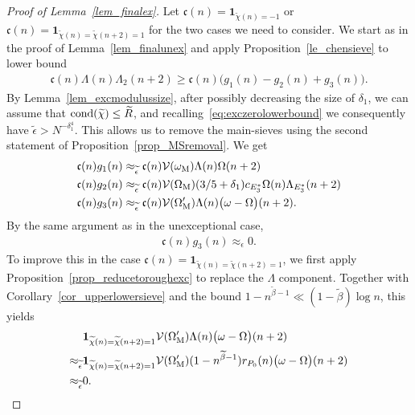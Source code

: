 \documentclass[12pt]{amsart}
\theoremstyle{definition}
\theoremstyle{remark}
\numberwithin{equation}{section}
\newcommand{\1}{\mathbf{1}}
\newcommand{\cond}[1]{\textnormal{cond}{#1}}
\begin{document}
			
			\begin{proof}[Proof of Lemma~\ref{lem_finalex}]
                Let $\mathfrak{c}(n)=  \1_{\widetilde{\chi}(n)=-1} $ or $\mathfrak{c}(n)=\1_{\widetilde{\chi}(n)=\widetilde{\chi}(n+2)=1}$ for the two cases we need to consider. We start as in the proof of Lemma~\ref{lem_finalunex} and apply Proposition~\ref{le_chensieve} to lower bound
                \begin{align*}
                    \mathfrak{c}(n)\Lambda(n)\Lambda_2(n+2)\geq  \mathfrak{c}(n)\bigl(g_1(n)-g_2(n)+g_3(n)\bigr).
                \end{align*}
                By Lemma~\ref{lem_excmodulussize}, after possibly decreasing the size of $\delta_1$, we can assume that $\cond(\widetilde{\chi})\leq \widetilde{R}$, and recalling~\eqref{eq:exczerolowerbound} we consequently have $\widetilde{\epsilon}>N^{-\delta_1^{4}}$. This allows us to remove the main-sieves using the second statement of Proposition~\ref{prop_MSremoval}. We get
                \begin{align*}
                \mathfrak{c}(n)g_1(n)&\approx_{\widetilde{\epsilon}} \mathfrak{c}(n) \mathcal{V}(\omega_{\textup{M}}) \Lambda(n)\Omega(n+2) \\
                \mathfrak{c}(n)g_2(n)&\approx_{\widetilde{\epsilon}} \mathfrak{c}(n)\mathcal{V}(\Omega_{\textup{M}})(3/5+\delta_1)c_{E_3^*}\Omega(n)\Lambda_{E_3^*}(n+2)\\
               \mathfrak{c}(n) g_3(n)&\approx_{\widetilde{\epsilon}} \mathfrak{c}(n) \mathcal{V}(\Omega'_{\textup{M}}) \Lambda(n)\bigl(\omega -\Omega\bigr)(n+2).
              \end{align*}
              By the same argument as in the unexceptional case,
              \begin{align*}
                 \mathfrak{c}(n) g_3(n)\approx_\epsilon 0.
              \end{align*}
              To improve this in the case $\mathfrak{c}(n)=\1_{\widetilde{\chi}(n)=\widetilde{\chi}(n+2)=1}$, we first apply Proposition~\ref{prop_reducetoroughexc} to replace the $\Lambda$ component. Together with Corollary~\ref{cor_upperlowersieve} and the bound $1-n^{\widetilde{\beta}-1}\ll (1-\widetilde{\beta})\log n$, this yields 
              \begin{align*}
                  &\1_{\widetilde{\chi}(n)=\widetilde{\chi}(n+2)=1} \mathcal{V}(\Omega'_{\textup{M}}) \Lambda(n)\bigl(\omega -\Omega\bigr)(n+2)\\
                  \approx_{\widetilde{\epsilon}}& \1_{\widetilde{\chi}(n)=\widetilde{\chi}(n+2)=1} \mathcal{V}(\Omega'_{\textup{M}}) (1-n^{\widetilde{\beta}-1})r_{P_0}(n)\bigl(\omega -\Omega\bigr)(n+2)\\
                  \approx_{\widetilde{\epsilon}}&0.
              \end{align*}


\end{proof}
\end{document}
